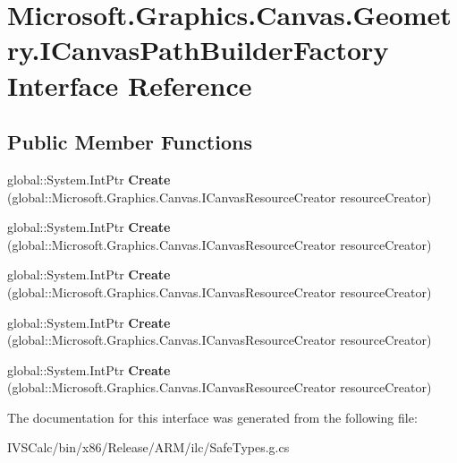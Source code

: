 \hypertarget{interface_microsoft_1_1_graphics_1_1_canvas_1_1_geometry_1_1_i_canvas_path_builder_factory}{}\section{Microsoft.\+Graphics.\+Canvas.\+Geometry.\+I\+Canvas\+Path\+Builder\+Factory Interface Reference}
\label{interface_microsoft_1_1_graphics_1_1_canvas_1_1_geometry_1_1_i_canvas_path_builder_factory}
\subsection*{Public Member Functions}
\begin{DoxyCompactItemize}
\item 
\mbox{\label{interface_microsoft_1_1_graphics_1_1_canvas_1_1_geometry_1_1_i_canvas_path_builder_factory_a428eb2412c423bc6603bc8c945063e13}} 
global\+::\+System.\+Int\+Ptr {\bfseries Create} (global\+::\+Microsoft.\+Graphics.\+Canvas.\+I\+Canvas\+Resource\+Creator resource\+Creator)
\item 
\mbox{\label{interface_microsoft_1_1_graphics_1_1_canvas_1_1_geometry_1_1_i_canvas_path_builder_factory_a428eb2412c423bc6603bc8c945063e13}} 
global\+::\+System.\+Int\+Ptr {\bfseries Create} (global\+::\+Microsoft.\+Graphics.\+Canvas.\+I\+Canvas\+Resource\+Creator resource\+Creator)
\item 
\mbox{\label{interface_microsoft_1_1_graphics_1_1_canvas_1_1_geometry_1_1_i_canvas_path_builder_factory_a428eb2412c423bc6603bc8c945063e13}} 
global\+::\+System.\+Int\+Ptr {\bfseries Create} (global\+::\+Microsoft.\+Graphics.\+Canvas.\+I\+Canvas\+Resource\+Creator resource\+Creator)
\item 
\mbox{\label{interface_microsoft_1_1_graphics_1_1_canvas_1_1_geometry_1_1_i_canvas_path_builder_factory_a428eb2412c423bc6603bc8c945063e13}} 
global\+::\+System.\+Int\+Ptr {\bfseries Create} (global\+::\+Microsoft.\+Graphics.\+Canvas.\+I\+Canvas\+Resource\+Creator resource\+Creator)
\item 
\mbox{\label{interface_microsoft_1_1_graphics_1_1_canvas_1_1_geometry_1_1_i_canvas_path_builder_factory_a428eb2412c423bc6603bc8c945063e13}} 
global\+::\+System.\+Int\+Ptr {\bfseries Create} (global\+::\+Microsoft.\+Graphics.\+Canvas.\+I\+Canvas\+Resource\+Creator resource\+Creator)
\end{DoxyCompactItemize}


The documentation for this interface was generated from the following file\+:\begin{DoxyCompactItemize}
\item 
I\+V\+S\+Calc/bin/x86/\+Release/\+A\+R\+M/ilc/Safe\+Types.\+g.\+cs\end{DoxyCompactItemize}
